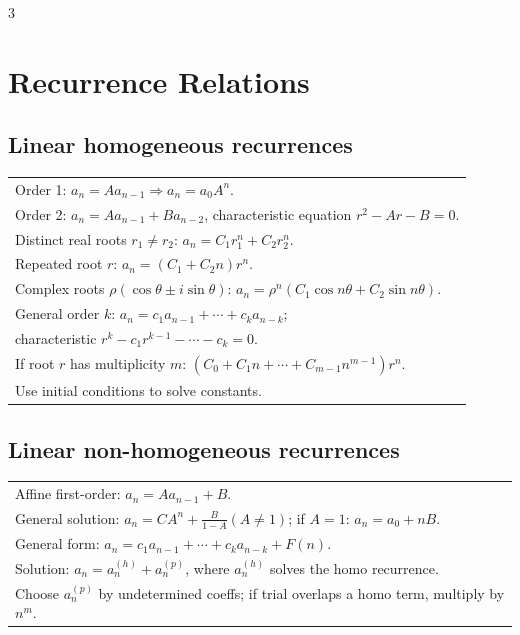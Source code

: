 \documentclass[10pt]{article}
\begin{document}
\begin{multicols*}{3}
\section*{Recurrence Relations}

\subsection*{Linear homogeneous recurrences}
\vspace{-1pt}
\begin{tabular}{@{}p{}@{}}
Order 1: $a_n=Aa_{n-1}\Rightarrow a_n=a_0A^n$.\\

Order 2: $a_n=Aa_{n-1}+Ba_{n-2}$, characteristic equation $r^2\!-\!Ar\!-\!B\!=\!0$.\\
Distinct real roots $r_1\ne r_2$: $a_n=C_1r_1^n+C_2r_2^n$.\\
Repeated root $r$: $a_n=(C_1+C_2n)r^n$.\\
Complex roots $\rho(\cos\theta\pm i\sin\theta)$: $a_n=\rho^n(C_1\cos n\theta+C_2\sin n\theta)$.\\
\vspace{1pt}
General order $k$: $a_n=c_1a_{n-1}+\cdots+c_ka_{n-k}$; \\
characteristic $r^k-c_1r^{k-1}-\cdots-c_k=0$.\\
If root $r$ has multiplicity $m$: $(C_0+C_1n+\cdots+C_{m-1}n^{m-1})r^n$. \\
Use initial conditions to solve constants.\\
\end{tabular}

\subsection*{Linear non-homogeneous recurrences}
\vspace{-1pt}
\begin{tabular}{@{}p{}@{}}
Affine first-order: $a_n=Aa_{n-1}+B$.\\
\vspace{-7pt}
General solution: $a_n=CA^n+\frac{B}{1-A}\!(A\!\ne\!1)$; if $A\!=\!1$: $a_n=a_0+nB$.\\
\vspace{-7pt}
General form: $a_n=c_1a_{n-1}+\cdots+c_ka_{n-k}+F(n)$.\\
Solution: $a_n=a_n^{(h)}+a_n^{(p)}$, where $a_n^{(h)}$ solves the homo recurrence.\\
Choose $a_n^{(p)}$ by undetermined coeffs; if trial overlaps a homo term, multiply by $n^m$.\\
\end{tabular}


\end{multicols*}
\end{document}
